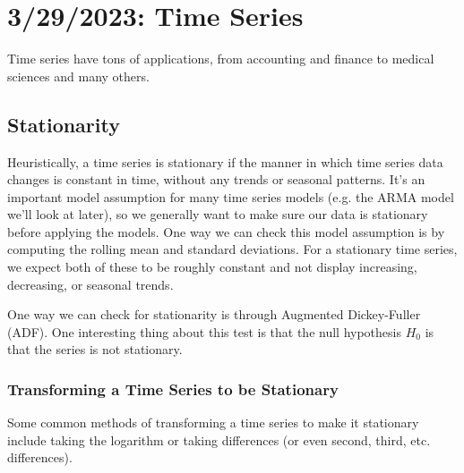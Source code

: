 \chapter{3/29/2023: Time Series}
Time series have tons of applications, from accounting and finance to medical sciences and many others.

\section{Stationarity}
Heuristically, a time series is stationary if the manner in which time series data changes is constant in time, without any trends or seasonal patterns. It's an important model assumption for many time series models (e.g. the ARMA model we'll look at later), so we generally want to make sure our data is stationary before applying the models.
One way we can check this model assumption is by computing the rolling mean and standard deviations. For a stationary time series, we expect both of these to be roughly constant and not display increasing, decreasing, or seasonal trends.

One way we can check for stationarity is through Augmented Dickey-Fuller (ADF). One interesting thing about this test is that the null hypothesis $H_0$ is that the series is not stationary.

\subsection{Transforming a Time Series to be Stationary}
Some common methods of transforming a time series to make it stationary include taking the logarithm or taking differences (or even second, third, etc. differences).

